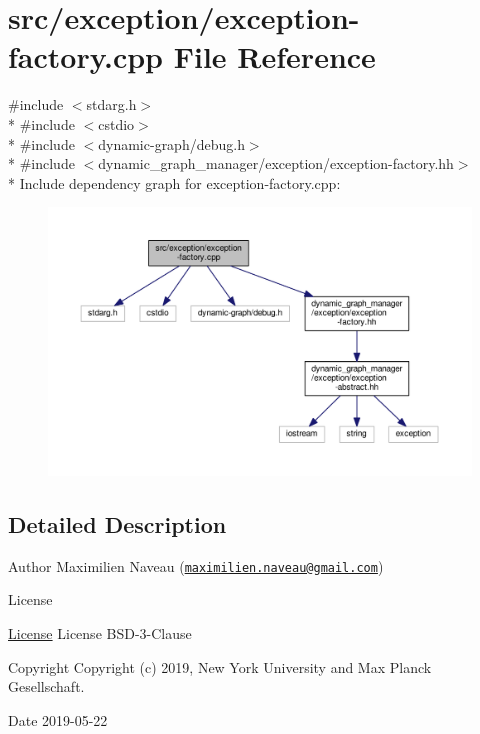 \hypertarget{exception-factory_8cpp}{}\section{src/exception/exception-\/factory.cpp File Reference}
\label{exception-factory_8cpp}
{\ttfamily \#include $<$stdarg.\+h$>$}\\*
{\ttfamily \#include $<$cstdio$>$}\\*
{\ttfamily \#include $<$dynamic-\/graph/debug.\+h$>$}\\*
{\ttfamily \#include $<$dynamic\+\_\+graph\+\_\+manager/exception/exception-\/factory.\+hh$>$}\\*
Include dependency graph for exception-\/factory.cpp\+:
\nopagebreak
\begin{figure}[H]
\begin{center}
\leavevmode
\includegraphics[width=350pt]{exception-factory_8cpp__incl}
\end{center}
\end{figure}


\subsection{Detailed Description}
\begin{DoxyAuthor}{Author}
Maximilien Naveau (\href{mailto:maximilien.naveau@gmail.com}{\tt maximilien.\+naveau@gmail.\+com}) 
\end{DoxyAuthor}
\begin{DoxyRefDesc}{License}
\item[\hyperlink{license__license000048}{License}]License B\+S\+D-\/3-\/\+Clause \end{DoxyRefDesc}
\begin{DoxyCopyright}{Copyright}
Copyright (c) 2019, New York University and Max Planck Gesellschaft. 
\end{DoxyCopyright}
\begin{DoxyDate}{Date}
2019-\/05-\/22 
\end{DoxyDate}
